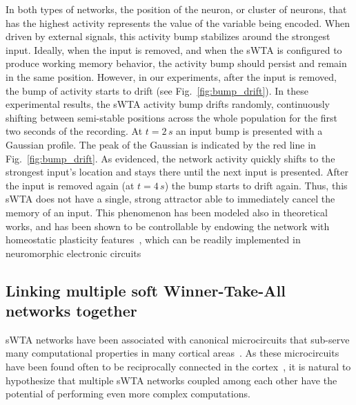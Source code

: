 In both types of networks, the position of the neuron, or cluster of neurons, that has the highest activity represents the value of the variable being encoded.
When driven by external signals, this activity bump stabilizes around the strongest input. Ideally, when the input is removed, and when the sWTA is configured to produce working memory behavior, the activity bump  should persist and remain in the same position. However, in our experiments, after the input is removed, the bump of activity starts to drift (see  Fig.~\ref{fig:bump_drift}). In these experimental results, the \ac{sWTA} activity bump drifts randomly, continuously shifting between semi-stable positions across the whole population for the first two seconds of the recording. At $t=2\,s$ an input bump is presented with a Gaussian profile. The peak of the Gaussian is indicated by the red line in  Fig.~\ref{fig:bump_drift}. As evidenced, the network activity quickly shifts to the strongest input's location and stays there until the next input is presented. After the input is removed again (at $t=4\,s$) the bump starts to drift again. Thus, this sWTA does not have a single, strong attractor able to immediately cancel the memory of an input. 
This phenomenon has been modeled also in theoretical works, and has been shown to be controllable by endowing the network with homeostatic plasticity features~\cite{Renart_etal03a}, which can be readily implemented in neuromorphic electronic circuits~\cite{Qiao_etal17,Bartolozzi_Indiveri09}

\subsection{Linking multiple soft Winner-Take-All networks together}
\label{sec:relnets}

\ac{sWTA} networks have been associated with canonical microcircuits that sub-serve many computational properties in many cortical areas~\cite{Bastos_etal12,Carandini_Heeger12,Jonke_etal17}. As these microcircuits have been found often to be reciprocally connected in the cortex~\cite{Binzegger_etal09}, it is natural to hypothesize that multiple \ac{sWTA} networks coupled among each other have the potential of performing even more complex computations.

